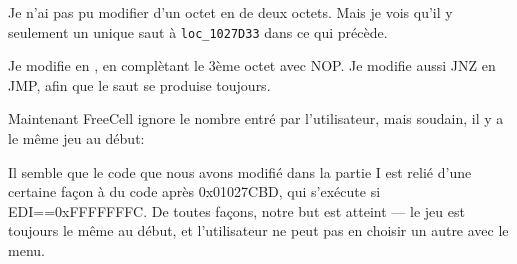Je n'ai pas pu modifier  d'un octet en  de deux octets.
Mais je vois qu'il y seulement un unique saut à \verb|loc_1027D33| dans ce qui précède.

Je modifie  en , en complètant le 3ème octet
avec \ac{NOP}.
Je modifie aussi JNZ en JMP, afin que le saut se produise toujours.

Maintenant FreeCell ignore le nombre entré par l'utilisateur, mais soudain, il y
a le même jeu au début:

\begin{figure}[H]
\centering
{}
\end{figure}

Il semble que le code que nous avons modifié dans la partie I est relié d'une certaine
façon à du code après 0x01027CBD, qui s'exécute si EDI==0xFFFFFFFC.
De toutes façons, notre but est atteint --- le jeu est toujours le même au début,
et l'utilisateur ne peut pas en choisir un autre avec le menu.

